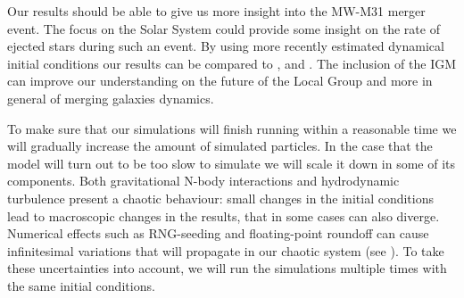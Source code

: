 \documentclass[10pt,english]{article}
\begin{document}
\smallskip
Our results should be able to give us more insight into the MW-M31 merger event. The focus on the Solar System could provide some insight on the rate of ejected stars during such an event. By using more recently estimated dynamical initial conditions our results can be compared to \textcite{Cox_2008}, \textcite{van_der_Marel_2012b} and \textcite{Schiavi_2019}. The inclusion of the IGM can improve our understanding on the future of the Local Group and more in general of merging galaxies dynamics.\par
\smallskip
To make sure that our simulations will finish running within a reasonable time we will gradually increase the amount of simulated particles. In the case that the model will turn out to be too slow to simulate we will scale it down in some of its components. Both gravitational N-body interactions and hydrodynamic turbulence present a chaotic behaviour: small changes in the initial conditions lead to macroscopic changes in the results, that in some cases can also diverge. Numerical effects such as RNG-seeding and floating-point roundoff can cause infinitesimal variations that will propagate in our chaotic system (see \textcite{Keller_2018}). To take these uncertainties into account, we will run the simulations multiple times with the same initial conditions.\par
\smallskip
\end{document}
